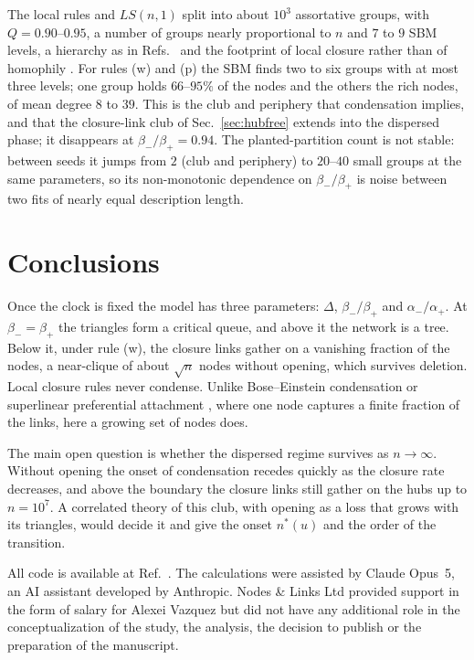 \documentclass[aps,pre,twocolumn,superscriptaddress,floatfix,nofootinbib]{revtex4-2}
\begin{document}
The local rules and $LS(n,1)$ split into about $10^3$ assortative groups, with
$Q=0.90$--$0.95$, a number of groups nearly proportional to $n$ and $7$ to $9$
SBM levels, a hierarchy as in Refs.~\cite{jin2001,bianconi2014} and the
footprint of local closure rather than of homophily \cite{peixoto2022}. For rules
(w) and (p) the SBM finds two to six groups with at most three levels; one group holds
$66$--$95\%$ of the nodes and the others the rich nodes, of mean degree $8$ to
$39$. This is the club and periphery that condensation implies, and that the
closure-link club of Sec.~\ref{sec:hubfree} extends into the dispersed
phase; it disappears at $\beta_-/\beta_+=0.94$. The planted-partition count is
not stable: between seeds it jumps from $2$ (club and periphery) to $20$--$40$
small groups at the same parameters, so its non-monotonic dependence on
$\beta_-/\beta_+$ is noise between two fits of nearly equal description length.

\section{Conclusions}

Once the clock is fixed the model has three parameters: $\Delta$,
$\beta_-/\beta_+$ and $\alpha_-/\alpha_+$. At $\beta_-=\beta_+$ the triangles
form a critical queue, and above it the network is a tree. Below it, under rule
(w), the closure links gather on a vanishing fraction of the nodes, a
near-clique of about $\sqrt n$ nodes without opening, which survives deletion.
Local closure rules never condense. Unlike Bose--Einstein condensation
\cite{bianconi2001} or superlinear preferential attachment
\cite{krapivsky2000}, where one node captures a finite fraction of the links,
here a growing set of nodes does.

The main open question is whether the dispersed regime survives as
$n\to\infty$. Without opening the onset of condensation recedes quickly as the
closure rate decreases, and above the boundary the closure links still gather
on the hubs up to $n=10^7$. A correlated
theory of this club, with opening as a loss that grows with its triangles,
would decide it and give the onset $n^*(u)$ and the order of the transition.

\begin{acknowledgments}
All code is available at Ref.~\cite{code}.
The calculations were assisted by Claude Opus~5, an AI assistant developed by Anthropic. Nodes \& Links Ltd
provided support in the form of salary for Alexei Vazquez but did not have any additional role in the conceptualization of the study, the
analysis, the decision to publish or the preparation of the manuscript.
\end{acknowledgments}
\end{document}
